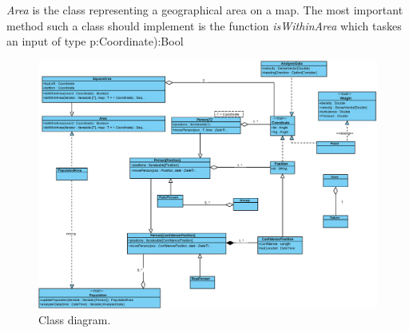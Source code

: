 \emph{Area} is the class representing a geographical area on a map. The most important method such a class should implement is the function \emph{isWithinArea} which taskes an input of type p:Coordinate):Bool

\begin{figure}
\centering
\includegraphics[width=\linewidth]{figures/class.eps}
\caption{Class diagram.}
\label{fig:class}
\end{figure}
